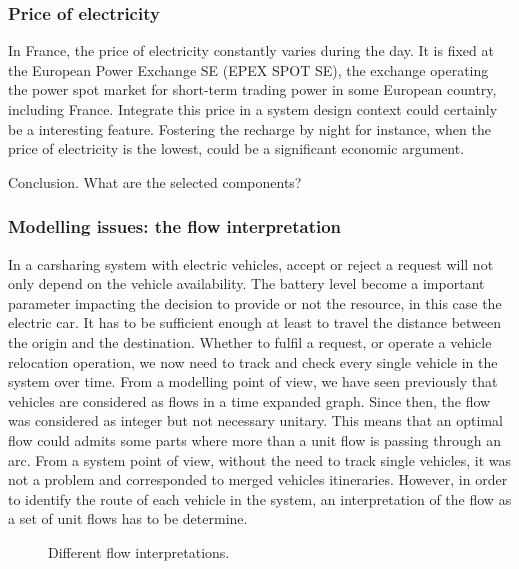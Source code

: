 \begin{bibunit}[ieeetr]

\subsubsection{Price of electricity}
In France, the price of electricity constantly varies during the day.
It is fixed at the European Power Exchange SE (EPEX SPOT SE), the exchange operating the power spot market for short-term trading power in some European country, including France.
Integrate this price in a system design context could certainly be a interesting feature.
Fostering the recharge by night for instance, when the price of electricity is the lowest, could be a significant  economic argument.


\bigskip
Conclusion. What are the selected components?


\subsubsection{Modelling issues: the flow interpretation}
In a carsharing system with electric vehicles, accept or reject a request will not only depend on the vehicle availability.
The battery level become a important parameter impacting the decision to provide or not the resource, in this case the electric car.
It has to be sufficient enough at least to travel the distance between the origin and the destination.
Whether to fulfil a request, or operate a vehicle relocation operation, we now need to track and check every single vehicle in the system over time.
From a modelling point of view, we have seen previously that vehicles are considered as flows in a time expanded graph.
Since then, the flow was considered as integer but not necessary unitary.
This means that an optimal flow could admits some parts where more than a unit flow is passing through an arc.
From a system point of view, without the need to track single vehicles, it was not a problem and corresponded to merged vehicles itineraries.
However, in order to identify the route of each vehicle in the system, an interpretation of the flow as a set of unit flows has to be determine.

\begin{figure}[t]
\begin{center}

\end{center}
\caption{Different flow interpretations.}
\label{fig:flowInterpretation}
\end{figure}


\end{bibunit}
